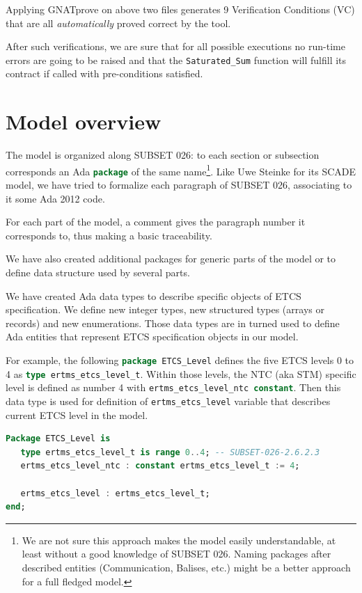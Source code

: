 \documentclass{template/openetcs_report}
\newcommand{\Ada}[1]{\lstinline[language=Ada,basicstyle={\sffamily},framesep=0pt]{#1}}
\begin{document}


Applying GNATprove on above two files generates 9 Verification
Conditions (VC) that are all \emph{automatically} proved correct by
the tool.

After such verifications, we are sure that for all possible executions
no run-time errors are going to be raised and that the
\Ada{Saturated_Sum} function will fulfill its contract if called with
pre-conditions satisfied.

\chapter{Model overview}

The model is organized along SUBSET 026: to each section or subsection
corresponds an Ada \Ada{package} of the same name\footnote{We are not
  sure this approach makes the model easily understandable, at least
  without a good knowledge of SUBSET 026. Naming packages after
  described entities (Communication, Balises, etc.) might be a better
  approach for a full fledged model.}. Like Uwe Steinke for its SCADE
model, we have tried to formalize each paragraph of SUBSET 026,
associating to it some Ada 2012 code.

For each part of the model, a comment gives the paragraph number it
corresponds to, thus making a basic traceability.

We have also created additional packages for generic parts of the
model or to define data structure used by several parts.

We have created Ada data types to describe specific objects of ETCS
specification. We define new integer types, new structured types
(arrays or records) and new enumerations. Those data types are in
turned used to define Ada entities that represent ETCS specification
objects in our model.

For example, the following \Ada{package ETCS_Level} defines the five
ETCS levels 0 to 4 as \Ada{type ertms_etcs_level_t}. Within those
levels, the NTC (aka STM) specific level is defined as number 4 with
\Ada{ertms_etcs_level_ntc constant}. Then this data type is used for
definition of \Ada{ertms_etcs_level} variable that describes current
ETCS level in the model.

\begin{lstlisting}[language=Ada]
Package ETCS_Level is
   type ertms_etcs_level_t is range 0..4; -- SUBSET-026-2.6.2.3
   ertms_etcs_level_ntc : constant ertms_etcs_level_t := 4;

   ertms_etcs_level : ertms_etcs_level_t;
end;
\end{lstlisting}
\end{document}
